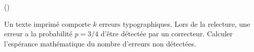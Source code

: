 \begin{exercice}\label{exo4-7} (\coolexo)

Un texte imprim\'e comporte $k$ erreurs typographiques. Lors de la relecture, une erreur a la 
probabilit\'e $p = 3/4$ d'\^etre d\'etect\'ee par un correcteur. Calculer l'esp\'erance math\'ematique du nombre d'erreurs non d\'etect\'ees.\\


\end{exercice}
